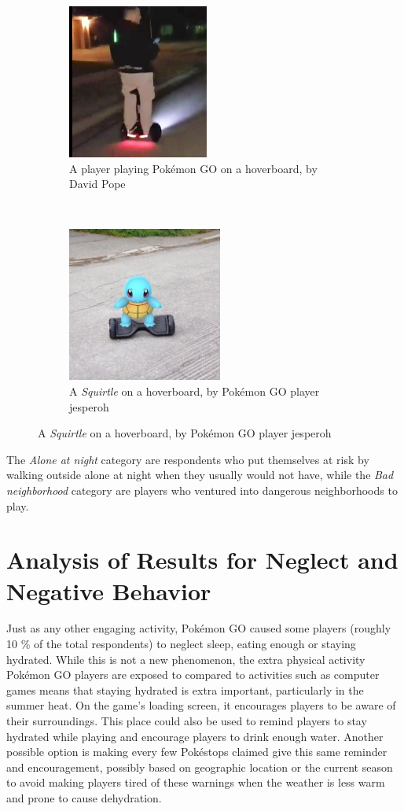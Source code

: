 \begin{figure}[h]
	\centering
	\begin{subfigure}[t]{0.45\textwidth}
		\centering
		\includegraphics[height=2in]{Figures/segway-hoverboard-playing}
		\caption{A player playing Pokémon GO on a hoverboard, by David Pope}
	\end{subfigure}
	~
	\begin{subfigure}[t]{0.45\textwidth}
		\centering
		\includegraphics[height=2in]{Figures/pogo-squirtle-hoverboard}
		\caption{A \emph{Squirtle} on a hoverboard, by Pokémon GO player jesperoh}
	\end{subfigure}
\end{figure}

The \emph{Alone at night} category are respondents who put themselves at risk by walking outside alone at night when they usually would not have, while the \emph{Bad neighborhood} category are players who ventured into dangerous neighborhoods to play.

\section{Analysis of Results for Neglect and Negative Behavior}

Just as any other engaging activity, Pokémon GO caused some players (roughly 10 \% of the total respondents) to neglect sleep, eating enough or staying hydrated. While this is not a new phenomenon, the extra physical activity Pokémon GO players are exposed to compared to activities such as computer games means that staying hydrated is extra important, particularly in the summer heat. On the game's loading screen, it encourages players to be aware of their surroundings. This place could also be used to remind players to stay hydrated while playing and encourage players to drink enough water. Another possible option is making every few Pokéstops claimed give this same reminder and encouragement, possibly based on geographic location or the current season to avoid making players tired of these warnings when the weather is less warm and prone to cause dehydration.

